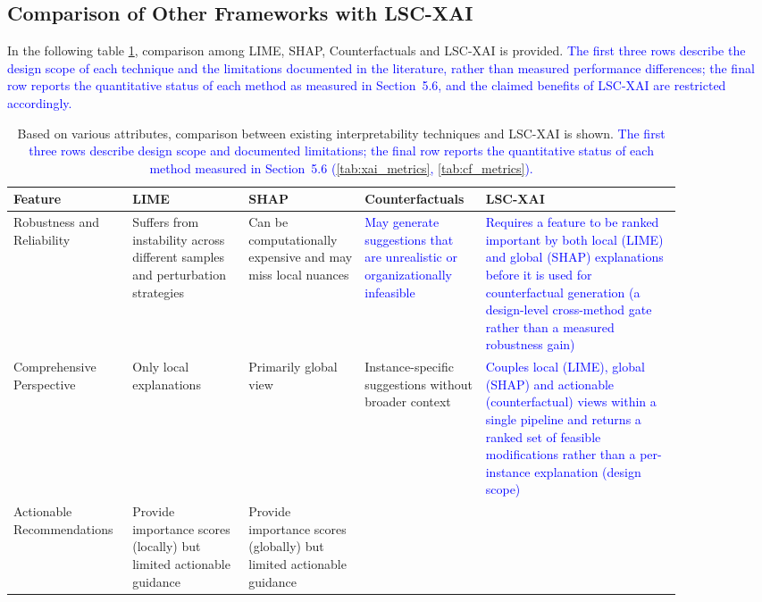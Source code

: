 \documentclass[a4paper,fleqn]{cas-sc}
\begin{document}
\subsection{Comparison of Other Frameworks with LSC-XAI}
In the following table \ref{tab:lsc_comparison}, comparison among LIME, SHAP, Counterfactuals and LSC-XAI is provided. \textcolor{blue}{The first three rows describe the design scope of each technique and the limitations documented in the literature, rather than measured performance differences; the final row reports the quantitative status of each method as measured in Section~5.6, and the claimed benefits of LSC-XAI are restricted accordingly.}
\begin{table}[width=1\linewidth,cols=5,pos=H]
\centering
\caption{Based on various attributes, comparison between existing interpretability techniques and LSC-XAI is shown. \textcolor{blue}{The first three rows describe design scope and documented limitations; the final row reports the quantitative status of each method measured in Section~5.6 (\cref{tab:xai_metrics}, \ref{tab:cf_metrics}).}}
\label{tab:lsc_comparison}
\renewcommand{\arraystretch}{1.075} %
\begin{tabular*}{\tblwidth}{p{0.12\linewidth}p{0.16\linewidth}p{0.16\linewidth}p{0.16\linewidth}p{0.27\linewidth}}
\hline
\textbf{Feature} & \textbf{LIME} & \textbf{SHAP} & \textbf{Counterfactuals} & \textbf{LSC-XAI} \\
\hline
Robustness and Reliability &  
Suffers from instability across different samples and perturbation strategies & 
Can be computationally expensive and may miss local nuances & 
\textcolor{blue}{May generate suggestions that are unrealistic or organizationally infeasible} & \textcolor{blue}{Requires a feature to be ranked important by both local (LIME) and global (SHAP) explanations before it is used for counterfactual generation (a design-level cross-method gate rather than a measured robustness gain)}
\\\hline
Comprehensive Perspective &  
Only local explanations & 
Primarily global view & 
Instance-specific suggestions without broader context &  \textcolor{blue}{Couples local (LIME), global (SHAP) and actionable (counterfactual) views within a single pipeline and returns a ranked set of feasible modifications rather than a per-instance explanation (design scope)}
\\\hline
Actionable Recommendations &  
Provide importance scores (locally) but limited actionable guidance & 
Provide importance scores (globally) but limited actionable guidance & 

\end{tabular*}
\end{table}
\end{document}
